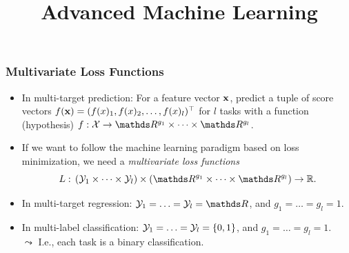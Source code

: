 \documentclass[11pt,compress,t,notes=noshow, xcolor=table]{beamer}
\title{Advanced Machine Learning}
\date{}
\begin{document}



\sloppy


\begin{frame}
	\frametitle{Multivariate Loss Functions}
	\begin{itemize}
%		
		\small
%		
		\item In multi-target prediction: For a feature vector $\mathbf{x}$, predict a tuple of score vectors $f(\mathbf{x}) = (f(x)_1, f(x)_2, \ldots, f(x)_l)^\top$ for $l$ tasks with a function (hypothesis) $f: \Xspace \rightarrow \R^{g_1} \times \cdots \times \R^{g_l} $.
        \vspace{15pt}
%		
		\item If we want to follow the machine learning paradigm based on loss minimization, we need a \emph{multivariate loss functions} 
		$$
		L: \, (\Yspace_1 \times \cdots \times \Yspace_l) \times (\R^{g_1} \times \cdots \times \R^{g_l}) \rightarrow \mathbb{R}.
		$$ 
        \vspace{15pt}

        \item In multi-target regression: $\Yspace_1 = \ldots = \Yspace_l = \R$, and $g_1 = \ldots = g_l = 1$.
        \vspace{15pt}

        \item In multi-label classification: $\mathcal{Y}_1 =  \ldots = \mathcal{Y}_l = \{0, 1\}$, and $g_1 = \ldots = g_l = 1$. \\ $\leadsto$ I.e., each task is a binary classification.

%				
%		
%
	\end{itemize}
	
\end{frame}
\end{document}
